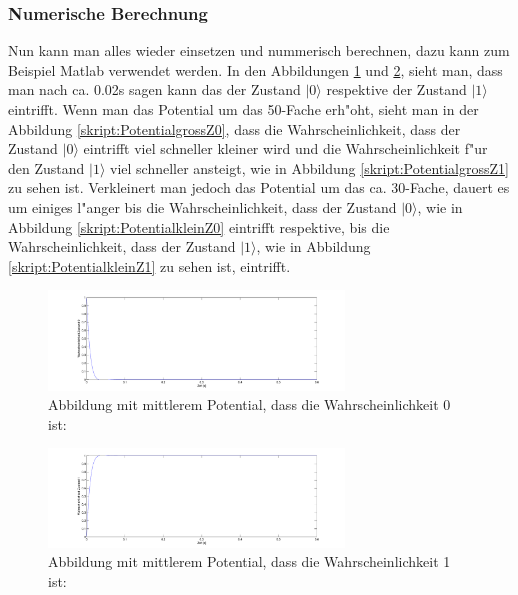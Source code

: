 \begin{refsection}
\subsubsection{Numerische Berechnung}
Nun kann man alles wieder einsetzen und nummerisch berechnen, dazu kann
zum Beispiel Matlab verwendet werden.
In den Abbildungen \ref{skript:StandardZ0} und \ref{skript:StandardZ1},
sieht man, dass man nach ca. 0.02s sagen kann das der Zustand
$|0\rangle$ respektive der Zustand $|1\rangle$ eintrifft. Wenn man
das Potential um das 50-Fache erh"oht, sieht man in der Abbildung
\ref{skript:PotentialgrossZ0}, dass die Wahrscheinlichkeit, dass
der Zustand $|0\rangle$ eintrifft viel schneller kleiner wird und die
Wahrscheinlichkeit f"ur den Zustand $|1\rangle$ viel schneller ansteigt,
wie in Abbildung \ref{skript:PotentialgrossZ1} zu sehen ist. Verkleinert
man jedoch das Potential um das ca. 30-Fache, dauert es um einiges
l"anger bis die Wahrscheinlichkeit, dass der Zustand $|0\rangle$, wie
in Abbildung \ref{skript:PotentialkleinZ0} eintrifft respektive, bis
die Wahrscheinlichkeit, dass der Zustand $|1\rangle$, wie in Abbildung
\ref{skript:PotentialkleinZ1} zu sehen ist, eintrifft.

\begin{figure}
\centering
\includegraphics[width=0.7\textwidth]{flash/graphics/StandardZ0.pdf}
\caption{Abbildung mit mittlerem Potential, dass die Wahrscheinlichkeit 0 ist:
\label{skript:StandardZ0}}
\end{figure}
\begin{figure}
\centering
\includegraphics[width=0.7\textwidth]{flash/graphics/StandardZ1.pdf}
\caption{Abbildung mit mittlerem Potential, dass die Wahrscheinlichkeit 1 ist:
\label{skript:StandardZ1}}
\end{figure}


\end{refsection}

